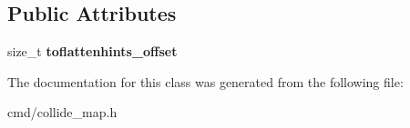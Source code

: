 \subsection*{Public Attributes}
\begin{DoxyCompactItemize}
\item 
size\+\_\+t {\bfseries toflattenhints\+\_\+offset}\hypertarget{classCollideArray_1_1CollidableBackref_a0da0a644a9f3c7c552848686c6584d2f}{}\label{classCollideArray_1_1CollidableBackref_a0da0a644a9f3c7c552848686c6584d2f}

\end{DoxyCompactItemize}


The documentation for this class was generated from the following file\+:\begin{DoxyCompactItemize}
\item 
cmd/collide\+\_\+map.\+h\end{DoxyCompactItemize}
